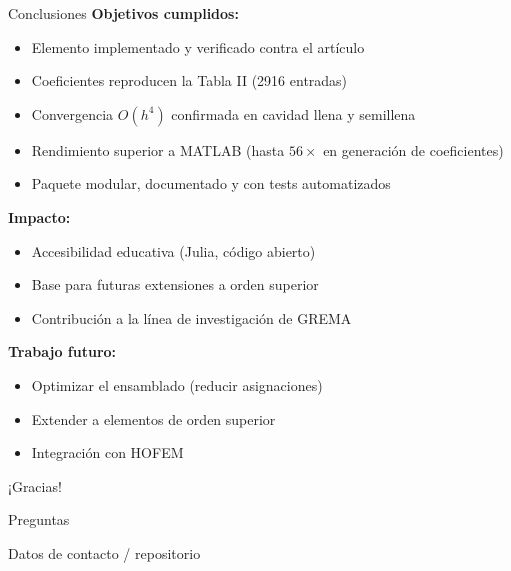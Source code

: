 \documentclass[aspectratio=169,11pt]{beamer}
\begin{document}
\begin{frame}{Conclusiones}
  \textbf{Objetivos cumplidos:}
  \begin{itemize}
    \item Elemento implementado y verificado contra el artículo
    \item Coeficientes reproducen la Tabla II (2916 entradas)
    \item Convergencia $O(h^4)$ confirmada en cavidad llena y semillena
    \item Rendimiento superior a MATLAB (hasta $56\times$ en generación de
          coeficientes)
    \item Paquete modular, documentado y con tests automatizados
  \end{itemize}

  \vspace{2mm}
  \textbf{Impacto:}
  \begin{itemize}
    \item Accesibilidad educativa (Julia, código abierto)
    \item Base para futuras extensiones a orden superior
    \item Contribución a la línea de investigación de GREMA
  \end{itemize}

  \vspace{2mm}
  \textbf{Trabajo futuro:}
  \begin{itemize}
    \item Optimizar el ensamblado (reducir asignaciones)
    \item Extender a elementos de orden superior
    \item Integración con HOFEM
  \end{itemize}
\end{frame}

\begin{frame}
  \centering
  \Huge \textcolor{azulUC3M}{¡Gracias!}
  \vspace{8mm}

  \normalsize
  Preguntas

  \vspace{4mm}
  \footnotesize\color{grisUC3M}
  Datos de contacto / repositorio
\end{frame}
\end{document}
